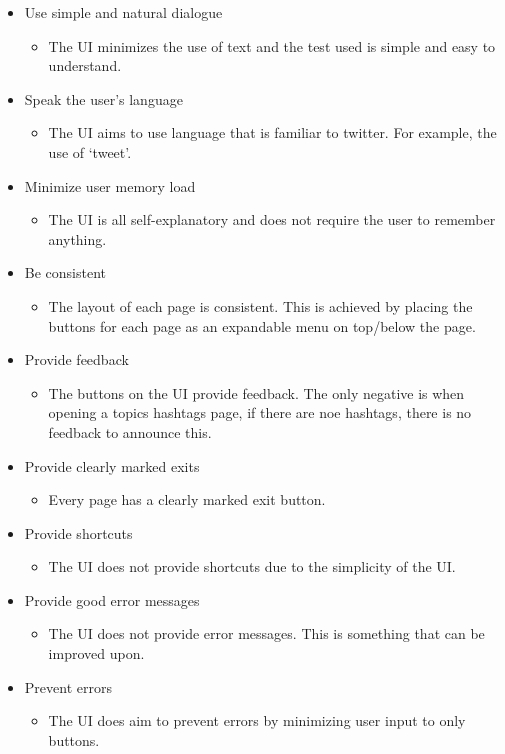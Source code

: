 \begin{itemize}
    \item Use simple and natural dialogue
    \begin{itemize}
        \item The UI minimizes the use of text and the test used is simple and easy to understand.
    \end{itemize}
    \item Speak the user's language
    \begin{itemize}
        \item The UI aims to use language that is familiar to twitter. For example, the use of `tweet'.
    \end{itemize}
    \item Minimize user memory load
    \begin{itemize}
        \item The UI is all self-explanatory and does not require the user to remember anything.
    \end{itemize}
    \item Be consistent
    \begin{itemize}
        \item The layout of each page is consistent. This is achieved by placing the buttons for each page as
                an expandable menu on top/below the page.
    \end{itemize}
    \item Provide feedback
    \begin{itemize}
        \item The buttons on the UI provide feedback. The only negative is when opening a topics hashtags page, if there are noe hashtags, there is no feedback to announce this.
    \end{itemize}
    \item Provide clearly marked exits
    \begin{itemize}
        \item Every page has a clearly marked exit button.
    \end{itemize}
    \item Provide shortcuts
    \begin{itemize}
        \item The UI does not provide shortcuts due to the simplicity of the UI.
    \end{itemize}
    \item Provide good error messages
    \begin{itemize}
        \item The UI does not provide error messages. This is something that can be improved upon.
    \end{itemize}
    \item Prevent errors
    \begin{itemize}
        \item The UI does aim to prevent errors by minimizing user input to only buttons.
    \end{itemize}
\end{itemize}

